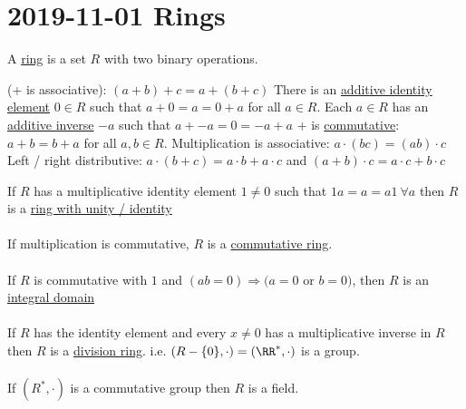 \documentclass[class=scrartcl, crop=false]{standalone}
\begin{document}
\section{2019-11-01 Rings}

\begin{definition}
  A \ul{ring} is a set $R$ with two binary operations.
  \begin{enumerate}
    \ii
    (+ is associative): $(a + b) + c = a + (b + c)$ 
    \ii
    There is an \ul{additive identity element} $0 \in R$ such that $a + 0 = a = 0 + a$ for all $a \in R$.
    \ii
    Each $a \in R$ has an \ul{additive inverse} $-a$ such that $a + -a = 0 = -a + a$ 
    \ii
    + is \ul{commutative}: $a + b = b + a$ for all $a, b \in R$.
    \ii
    Multiplication is associative: $a \cdot (bc) = (ab) \cdot c$ 
    \ii
    Left / right distributive: $a \cdot (b + c) = a\cdot b + a \cdot c$ and $(a + b) \cdot c = a \cdot c + b \cdot c$
  \end{enumerate}
\end{definition}

\begin{definition}
  If $R$ has a multiplicative identity element $1 \neq 0$ such that $1a = a = a1 \ \forall a$ then $R$ is a \ul{ring with unity / identity}
  \\\\
  If multiplication is commutative, $R$ is a \ul{commutative ring}.
  \\\\
  If $R$ is commutative with $1$ and $(ab = 0) \Rightarrow (a = 0$ or $b = 0)$, then $R$ is an \ul{integral domain}
  \\\\
  If $R$ has the identity element and every $x \neq 0$ has a multiplicative inverse in $R$ then $R$ is a \ul{division ring}. i.e. $(R - \{0\}, \cdot) = (\RR^*, \cdot)$ is a group.
  \\\\
  If $(R^*, \cdot)$ is a commutative group then $R$ is a field.
\end{definition}
\end{document}
